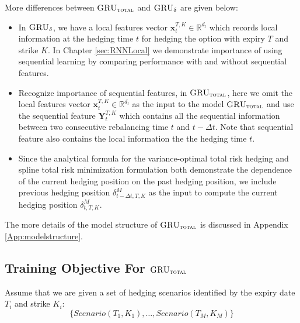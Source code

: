\documentclass[letterpaper,12pt,titlepage,oneside,final]{book}
\numberwithin{equation}{section}
\theoremstyle{definition}
\newcommand{\model}{\textsc{GRU}_\delta}
\newcommand{\modelT}{\textsc{GRU}_{\textsc{total}}}
\newcommand{\vx}{\mathbf{x}}
\newcommand{\DT}{\Delta t}
\newcommand{\Real}{\mathbb{R}}
\begin{document}
More differences between $\modelT$ and $\model$ are given below:
\begin{itemize}
	
	\item In $\model$, we have a local features vector $\vx^{T,K}_{t} \in \Real^{d_l}$ which records local information at the hedging time $t$ for hedging the option with expiry $T$ and strike $K$. In Chapter \ref{sec:RNNLocal} we demonstrate importance of using sequential learning by  comparing performance with and without sequential features. 
	
	\item Recognize importance of sequential features, in $\modelT$, here we omit the local features vector $\vx^{T,K}_{t} \in \Real^{d_l}$ as the input to the model $\modelT$ and use the sequential feature  $\mathbf{Y}_{t}^{T,K}$ which contains all the sequential information between two consecutive rebalancing time $t$ and $t-\DT$. 
	Note that sequential feature also contains the local information the the hedging time $t$.
	
	\item Since the analytical formula for the variance-optimal total risk hedging \cite{schweizer1995variance} and spline total risk minimization formulation \cite{coleman2007total} both  demonstrate the dependence of the current hedging position on the past hedging position, we include previous hedging position $\delta^{M}_{t-\Delta t,T,K}$ as the input to compute the current hedging position $\delta^{M}_{t,T,K}$. 
	
\end{itemize}
The more details of the  model structure of $\modelT$ is discussed in Appendix \ref{App:modelstructure}.


\subsection{Training Objective For $\modelT$}
\label{sec:TotalModelObj}
Assume that we are given  a set  of hedging scenarios identified by the expiry date $T_i$ and strike $K_i$:
\[
\{Scenario(T_1,K_1), \dots, Scenario(T_M,K_M)\}	
\]
\end{document}
